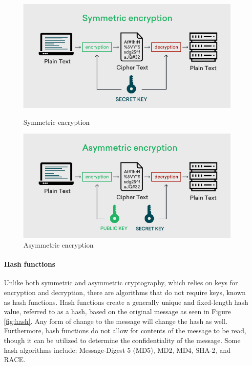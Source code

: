 \begin{figure}
    \centering
    \begin{minipage}{.5\textwidth}
        \centering
        \includegraphics[width=.9\textwidth]{../../img/chapter_2/symmetric-cryptography.jpg}
        \caption{Symmetric encryption}\label{fig:sym-crypt}
    \end{minipage}%
    \begin{minipage}{.5\textwidth}
        \centering
        \includegraphics[width=.9\textwidth]{../../img/chapter_2/asymmetric-cryptography.jpg}
        \caption{Asymmetric encryption}\label{fig:asym-crypt}
    \end{minipage}
\end{figure}

\paragraph{Hash functions}
Unlike both symmetric and asymmetric cryptography, which relies on keys for encryption and decryption, there are algorithms that do not require keys, known as hash functions. Hash functions create a generally unique and fixed-length hash value, referred to as a hash, based on the original message as seen in Figure \ref{fig:hash}. Any form of change to the message will change the hash as well. Furthermore, hash functions do not allow for  contents of the message to be read, though it can be utilized to determine the confidentiality of the message. Some hash algorithms include: Message-Digest 5 (MD5), MD2, MD4, SHA-2, and RACE. 

